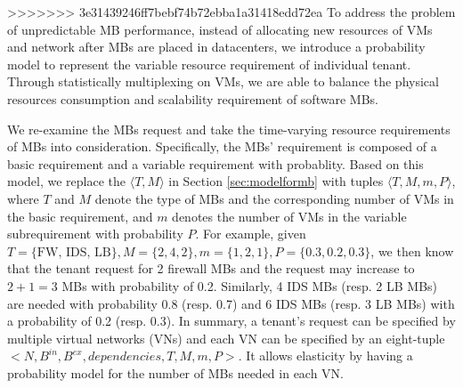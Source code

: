 \documentclass[review]{elsarticle}
\begin{document}



\appendix
>>>>>>> 3e31439246ff7bebf74b72ebba1a31418edd72ea
To address the problem of unpredictable MB performance, instead of allocating new resources of VMs and network after MBs are placed in datacenters, we introduce a probability model to represent the variable resource requirement of individual tenant. Through statistically multiplexing on VMs, we are able to balance the physical resources consumption and scalability requirement of software MBs. 

We re-examine the MBs request and take the time-varying resource requirements of MBs into consideration. Specifically, the MBs' requirement is composed of a basic requirement and a variable requirement with probablity. Based on this model, we replace the $\langle T, M \rangle$ in Section \ref{sec:modelformb} with tuples $\langle T, M, m, P\rangle$, where $T$ and $M$  denote the type of MBs and the corresponding number of VMs in the basic requirement, and $m$ denotes the number of VMs in the variable subrequirement with probability $P$. For example, given $T=\{\text{FW, IDS, LB}\}, M=\{ 2, 4, 2\}, m=\{1, 2, 1\}, P=\{0.3, 0.2, 0.3\}$, we then know that the tenant request for 2 firewall MBs and the request may increase to $2+1=3$ MBs with probability of 0.2. Similarly, 4 IDS MBs (resp. 2 LB MBs) are needed with probability 0.8 (resp. 0.7) and 6 IDS MBs (resp. 3 LB MBs) with a probability of 0.2 (resp. 0.3). In summary, a tenant's request can be specified by multiple virtual networks (VNs) and each VN can be specified by an eight-tuple $<N, B^{in}, B^{ex}, dependencies, T, M, m, P>$. It allows elasticity by having a probability model for the number of MBs needed in each VN. 
\end{document}
